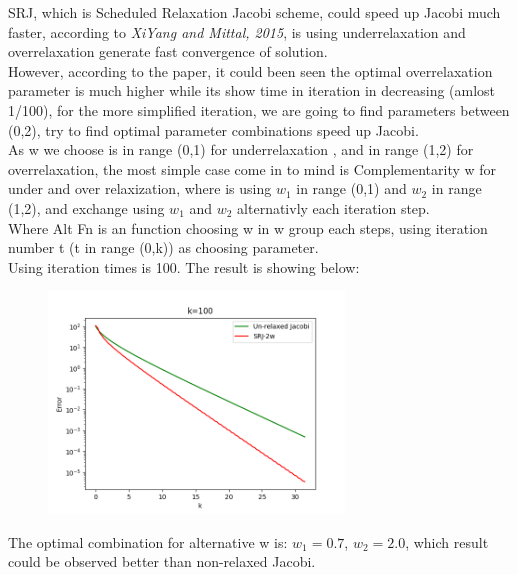 \documentclass[12pt]{article}
\begin{document}
SRJ, which is Scheduled Relaxation Jacobi scheme, could speed up Jacobi
much faster, according to \textit{XiYang and Mittal, 2015}, is using underrelaxation
and overrelaxation generate fast convergence of solution.\\

However, according to the paper, it could been seen the optimal overrelaxation 
parameter is much higher while its show time in iteration in decreasing (amlost 1/100),
for the more simplified iteration, we are going to find parameters between (0,2), 
try to find optimal parameter combinations speed up Jacobi.\\



As w we choose is in range (0,1) for underrelaxation
, and in range (1,2) for overrelaxation, the most simple case come in to
mind is Complementarity w for under and over relaxization, where is using
$w_{1}$ in range (0,1)  and $w_{2}$ in range (1,2), and exchange using
$w_1$ and $w_2$ alternativly each iteration step.\\


Where Alt Fn is an function choosing w in {w} group each steps, using iteration
number t (t in range (0,k)) as choosing parameter.\\

Using iteration times is 100. The result is showing below: 

\begin{figure}[H]
    \centering
    \includegraphics[width=0.7\textwidth]{SRJ1.png    }
    \label{SRJ1.png    }
\end{figure}

The optimal combination for alternative w is: $ w_1 = 0.7 $, $ w_2 = 2.0 $,
which result could be observed better than non-relaxed Jacobi.
\end{document}
